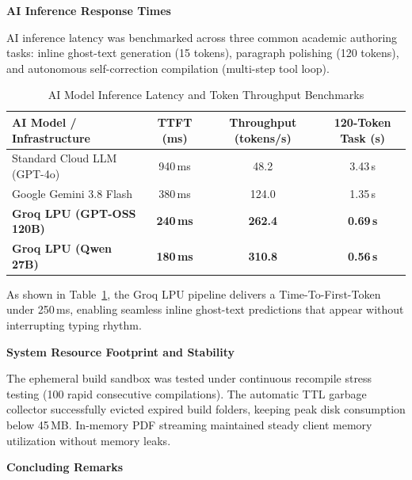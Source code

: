 \documentclass[12pt,a4paper,twoside]{article}
\newcommand{\numhead}[3]{%
  \begingroup\setlength{\parskip}{0pt}%
  \noindent\hspace*{0.25in}\makebox[0.25in][l]{\fontsize{18pt}{21.6pt}\selectfont\bfseries #1.}%
  {\fontsize{18pt}{21.6pt}\selectfont\bfseries #2}{\fontsize{18pt}{21.6pt}\selectfont #3}\par\nopagebreak
  \vspace{6pt}
  \endgroup}
\newcommand{\subhead}[2]{%
  \begingroup\setlength{\parskip}{0pt}\vspace{10pt}%
  \noindent\hspace*{0.25in}\makebox[0.35in][l]{\fontsize{13pt}{15.6pt}\selectfont\bfseries #1}%
  {\fontsize{13pt}{15.6pt}\selectfont\bfseries #2}\par\nopagebreak
  \vspace{4pt}
  \endgroup}
\begin{document}
\subhead{5.2}{AI Inference Response Times}
AI inference latency was benchmarked across three common academic authoring tasks: inline ghost-text generation (15 tokens), paragraph polishing (120 tokens), and autonomous self-correction compilation (multi-step tool loop).

\begin{table}[htbp]
\centering
\caption{AI Model Inference Latency and Token Throughput Benchmarks}
\label{tab:ai_benchmarks}
\vspace{4pt}
\small
\renewcommand{\arraystretch}{1.3}
\begin{tabularx}{\textwidth}{>{\raggedright\arraybackslash}p{5.4cm}ccc}
\toprule
\textbf{AI Model / Infrastructure} & \textbf{TTFT (ms)} & \textbf{Throughput (tokens/s)} & \textbf{120-Token Task (s)} \\
\midrule
Standard Cloud LLM (GPT-4o) & 940\,ms & 48.2 & 3.43\,s \\
Google Gemini 3.8 Flash & 380\,ms & 124.0 & 1.35\,s \\
\textbf{Groq LPU (GPT-OSS 120B)} & \textbf{240\,ms} & \textbf{262.4} & \textbf{0.69\,s} \\
\textbf{Groq LPU (Qwen 27B)} & \textbf{180\,ms} & \textbf{310.8} & \textbf{0.56\,s} \\
\bottomrule
\end{tabularx}
\end{table}

As shown in Table~\ref{tab:ai_benchmarks}, the Groq LPU pipeline delivers a Time-To-First-Token under 250\,ms, enabling seamless inline ghost-text predictions that appear without interrupting typing rhythm.

\subhead{5.3}{System Resource Footprint and Stability}
The ephemeral build sandbox was tested under continuous recompile stress testing (100 rapid consecutive compilations). The automatic TTL garbage collector successfully evicted expired build folders, keeping peak disk consumption below 45\,MB. In-memory PDF streaming maintained steady client memory utilization without memory leaks.

\newpage
\numhead{6}{Concluding Remarks}{}
\end{document}
